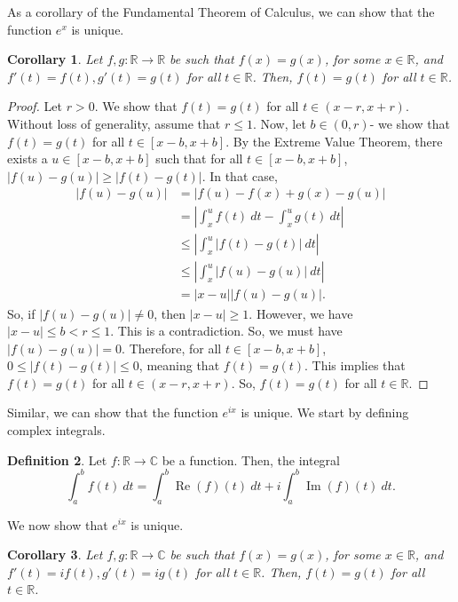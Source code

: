 \documentclass[a4paper, openany]{memoir}
\theoremstyle{definition}
\newtheorem{definition}{Definition}[section]
\theoremstyle{plain}
\newtheorem{corollary}[definition]{Corollary}
\begin{document}
As a corollary of the Fundamental Theorem of Calculus, we can show that the function $e^x$ is unique.
\begin{corollary}
Let $f, g: \mathbb{R} \to \mathbb{R}$ be such that $f(x) = g(x)$, for some $x \in \mathbb{R}$, and $f'(t) = f(t), g'(t) = g(t)$ for all $t \in \mathbb{R}$. Then, $f(t) = g(t)$ for all $t \in \mathbb{R}$.
\end{corollary}
\begin{proof}
Let $r > 0$. We show that $f(t) = g(t)$ for all $t \in (x-r, x+r)$. Without loss of generality, assume that $r \leqslant 1$. Now, let $b \in (0, r)$- we show that $f(t) = g(t)$ for all $t \in [x-b, x+b]$. By the Extreme Value Theorem, there exists a $u \in [x-b, x+b]$ such that for all $t \in [x-b, x+b]$, $|f(u) - g(u)| \geqslant |f(t) - g(t)|$. In that case,
\begin{align*}
    |f(u) - g(u)| &= |f(u) - f(x) + g(x) - g(u)| \\
    &= \left|\int_x^u f(t) \ dt - \int_x^u g(t) \ dt\right| \\
    &\leqslant \left|\int_x^u |f(t) - g(t)| \ dt\right| \\
    &\leqslant \left|\int_x^u |f(u) - g(u)| \ dt\right| \\
    &= |x-u| |f(u) - g(u)|.
\end{align*}
So, if $|f(u) - g(u)| \neq 0$, then $|x-u| \geqslant 1$. However, we have $|x-u| \leqslant b < r \leqslant 1$. This is a contradiction. So, we must have $|f(u) - g(u)| = 0$. Therefore, for all $t \in [x-b, x+b]$, $0 \leqslant |f(t) - g(t)| \leqslant 0$, meaning that $f(t) = g(t)$. This implies that $f(t) = g(t)$ for all $t \in (x-r, x+r)$. So, $f(t) = g(t)$ for all $t \in \mathbb{R}$.
\end{proof}
\noindent Similar, we can show that the function $e^{ix}$ is unique. We start by defining complex integrals.
\begin{definition}
Let $f: \mathbb{R} \to \mathbb{C}$ be a function. Then, the integral
\[\int_a^b f(t) \ dt = \int_a^b \operatorname{Re}(f)(t) \ dt + i \int_a^b\operatorname{Im}(f)(t) \ dt.\]
\end{definition}
\noindent We now show that $e^{ix}$ is unique.
\begin{corollary}
Let $f, g: \mathbb{R} \to \mathbb{C}$ be such that $f(x) = g(x)$, for some $x \in \mathbb{R}$, and $f'(t) = if(t), g'(t) = ig(t)$ for all $t \in \mathbb{R}$. Then, $f(t) = g(t)$ for all $t \in \mathbb{R}$.
\end{corollary}
\end{document}
